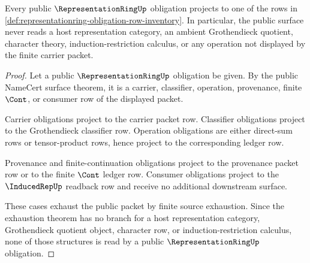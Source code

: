 \begin{theorem}
\label{thm:representationring-obligation-inventory-exhaustive}
Every public $\RepresentationRingUp$ obligation projects to one of the rows in
\autoref{def:representationring-obligation-row-inventory}. In particular, the
public surface never reads a host representation category, an ambient
Grothendieck quotient, character theory, induction-restriction calculus, or
any operation not displayed by the finite carrier packet.
\end{theorem}
\begin{proof}
Let a public $\RepresentationRingUp$ obligation be given. By the public
NameCert surface theorem, it is a carrier, classifier, operation, provenance,
finite $\Cont$, or consumer row of the displayed packet.

Carrier obligations project to the carrier packet row. Classifier obligations
project to the Grothendieck classifier row. Operation obligations are either
direct-sum rows or tensor-product rows, hence project to the corresponding
ledger row.

Provenance and finite-continuation obligations project to the provenance
packet row or to the finite $\Cont$ ledger row. Consumer obligations project
to the $\InducedRepUp$ readback row and receive no additional downstream
surface.

These cases exhaust the public packet by finite source exhaustion. Since the
exhaustion theorem has no branch for a host representation category,
Grothendieck quotient object, character row, or induction-restriction
calculus, none of those structures is read by a public
$\RepresentationRingUp$ obligation.
\end{proof}

